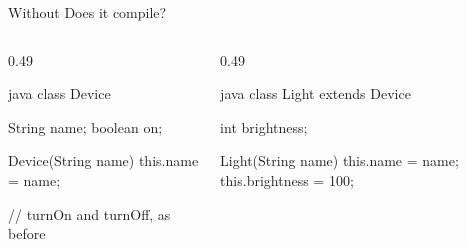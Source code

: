 \documentclass[\deckoptions]{beamer}
\begin{document}
\begin{frame}[fragile]{Without }{Does it compile?}
  \begin{columns}[T, onlytextwidth]
    \begin{column}{0.49\textwidth}
\begin{codeblock}[steps={||none|5-7|}, dense, marks={5-7/4/error/2}]{java}
class Device {
    String name;
    boolean on;

    Device(String name) {
        this.name = name;
    }

    // turnOn and turnOff, as before
}
\end{codeblock}
      \notesgap
      \begin{codenotes}[1]
      \end{codenotes}
    \end{column}
    \begin{column}{0.49\textwidth}
\begin{codeblock}[steps={||4-7|none|}, dense, marks={4-7/3/error/1}]{java}
class Light extends Device {
    int brightness;

    Light(String name) {
        this.name = name;
        this.brightness = 100;
    }

}
\end{codeblock}
\end{column}
\end{columns}
\end{frame}
\end{document}

